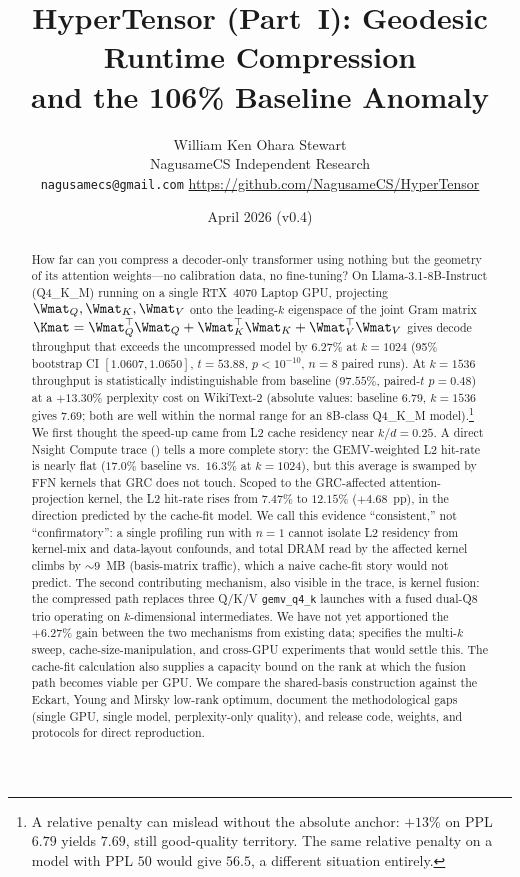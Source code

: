 \documentclass[11pt]{article}
\title{HyperTensor (Part~I): Geodesic Runtime Compression\\and the 106\% Baseline Anomaly}
\author{William Ken Ohara Stewart\\
\small NagusameCS Independent Research\\
\small \texttt{nagusamecs@gmail.com} \quad \url{https://github.com/NagusameCS/HyperTensor}}
\date{April 2026 (v0.4)}
\begin{document}
\hypertensorbanner

\begin{abstract}
\noindent
How far can you compress a decoder-only transformer using nothing but
the geometry of its attention weights---no calibration data, no
fine-tuning?  On Llama-3.1-8B-Instruct (Q4\_K\_M) running on a single
RTX~4070 Laptop GPU, projecting $\Wmat_Q,\Wmat_K,\Wmat_V$ onto the
leading-$k$ eigenspace of the joint Gram matrix
$\Kmat=\Wmat_Q^\top\Wmat_Q+\Wmat_K^\top\Wmat_K+\Wmat_V^\top\Wmat_V$
gives decode throughput that exceeds the uncompressed model
by $6.27\%$ at $k{=}1024$ (95\% bootstrap CI $[1.0607,1.0650]$, $t{=}53.88$,
$p<10^{-10}$, $n{=}8$ paired runs). At $k{=}1536$ throughput is
statistically indistinguishable from baseline ($97.55\%$, paired-$t$ $p{=}0.48$)
at a $+13.30\%$ perplexity cost on WikiText-2 (absolute values: baseline $6.79$, $k{=}1536$ gives $7.69$; both are well within the normal range for an 8B-class Q4\_K\_M model).\footnote{A relative penalty can mislead without the absolute anchor: $+13\%$ on PPL $6.79$ yields $7.69$, still good-quality territory. The same relative penalty on a model with PPL $50$ would give $56.5$, a different situation entirely.}  We first thought the speed-up came from L2 cache residency near $k/d{=}0.25$.
A direct Nsight Compute trace () tells a more
complete story: the GEMV-weighted L2 hit-rate is nearly flat ($17.0\%$ baseline vs.\
$16.3\%$ at $k{=}1024$), but this average is swamped by FFN kernels that GRC
does not touch. Scoped to the GRC-affected attention-projection kernel,
the L2 hit-rate rises from $7.47\%$ to $12.15\%$ ($+4.68$~pp), in the
direction predicted by the cache-fit model. We call this evidence
``consistent,'' not ``confirmatory'': a single profiling
run with $n{=}1$ cannot isolate L2 residency from kernel-mix and
data-layout confounds, and total DRAM read by the affected kernel
climbs by ${\sim}9$~MB (basis-matrix traffic), which a naive cache-fit
story would not predict. The second contributing mechanism, also visible in the trace,
is kernel fusion: the compressed path replaces three Q/K/V \texttt{gemv\_q4\_k}
launches with a fused dual-Q8 trio operating on $k$-dimensional intermediates.
We have not yet apportioned the $+6.27\%$ gain between the
two mechanisms from existing data;  specifies the
multi-$k$ sweep, cache-size-manipulation, and cross-GPU experiments that
would settle this. The cache-fit calculation also supplies a
capacity bound on the rank at which the fusion path becomes
viable per GPU. We compare the shared-basis construction against the
Eckart, Young and Mirsky low-rank optimum, document the methodological
gaps (single GPU, single model, perplexity-only quality), and release code,
weights, and protocols for direct reproduction.
\end{abstract}
\end{document}
